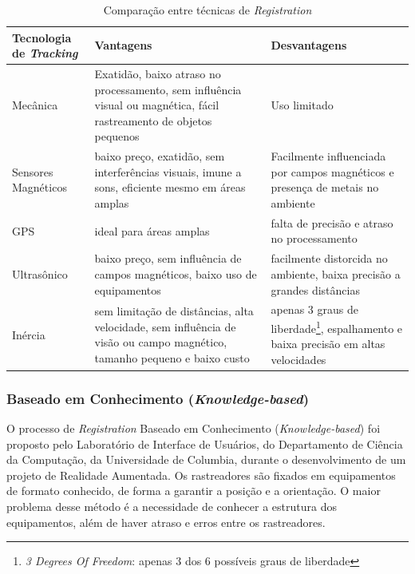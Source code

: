 \begin{table}[h!]
    \caption{Comparação entre técnicas de \textit{Registration}}
    \label{tab:track-reg-comp}
    \begin{tabular}{| p{5cm} | p{5cm} | p{5cm} |}
        \hline
        Tecnologia de \textit{Tracking} & Vantagens & Desvantagens \\
        \hline
        Mecânica & Exatidão, baixo atraso no processamento, sem influência visual ou magnética, fácil rastreamento de objetos pequenos & Uso limitado \\
        \hline
        Sensores Magnéticos & baixo preço, exatidão, sem interferências visuais, imune a sons, eficiente mesmo em áreas amplas & Facilmente influenciada por campos magnéticos e presença de metais no ambiente \\
        \hline
        GPS & ideal para áreas amplas & falta de precisão e atraso no processamento \\
        \hline
        Ultrasônico & baixo preço, sem influência de campos magnéticos, baixo uso de equipamentos & facilmente distorcida no ambiente, baixa precisão a grandes distâncias \\
        \hline
        Inércia & sem limitação de distâncias, alta velocidade, sem influência de visão ou campo magnético, tamanho pequeno e baixo custo & apenas 3 graus de liberdade\footnote{\textit{3 Degrees Of Freedom}: apenas 3 dos 6 possíveis graus de liberdade}, espalhamento e baixa precisão em altas velocidades \\
        \hline
    \end{tabular}
\end{table}




\subsubsection{Baseado em Conhecimento (\textit{Knowledge-based})}


O processo de \textit{Registration} Baseado em Conhecimento (\textit{Knowledge-based}) foi
proposto pelo Laboratório de Interface de Usuários, do Departamento de Ciência da Computação, 
da Universidade de Columbia, durante o desenvolvimento de um projeto de Realidade Aumentada.
Os rastreadores são fixados em equipamentos de formato conhecido, de forma a garantir a posição
e a orientação. O maior problema desse método é a necessidade de conhecer a estrutura dos equipamentos,
além de haver atraso e erros entre os rastreadores.



